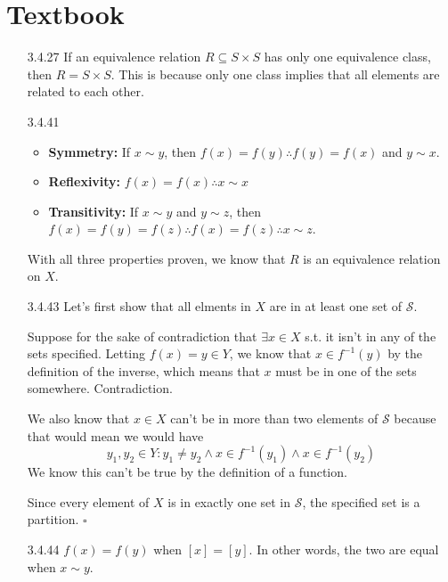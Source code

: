 \documentclass[12pt]{article}
\begin{document}
\section{Textbook}\label{sec:textbook}
\begin{itemize}
      \item[3.4.27] If an equivalence relation $R \subseteq S \times S$ has only one equivalence class, then $R=S \times S$.
            This is because only one class implies that all elements are related to each other.
      \item[3.4.41] \begin{itemize}
                  \item \textbf{Symmetry:}
                        If $x \sim y$, then $f(x)=f(y) \therefore f(y)=f(x)$ and $y \sim x$.
                  \item \textbf{Reflexivity:}
                        $f(x)=f(x) \therefore x \sim x$
                  \item \textbf{Transitivity:} If $x \sim y$ and $y \sim z$, then $f(x)=f(y)=f(z) \therefore f(x)=f(z) \therefore x \sim z$.
            \end{itemize}
            With all three properties proven, we know that $R$ is an equivalence relation on $X$.
      \item[3.4.43] Let's first show that all elments in $X$ are in at least one set of $\mathcal{S}$.

            Suppose for the sake of contradiction that $\exists x \in X$ s.t. it isn't in any of the sets specified.
            Letting $f(x)=y \in Y$, we know that $x \in f^{-1}(y)$ by the definition of the inverse,
            which means that $x$ must be in one of the sets somewhere.
            Contradiction.

            We also know that $x \in X$ can't be in more than two elements of $\mathcal{S}$
            because that would mean we would have
            \[y_1, y_2 \in Y: y_1 \ne y_2 \land x \in f^{-1}(y_1) \land x \in f^{-1}(y_2)\]
            We know this can't be true by the definition of a function.

            Since every element of $X$ is in exactly one set in $\mathcal{S}$, the specified set is a partition. $\square$
      \item[3.4.44] $f(x)=f(y)$ when $[x]=[y]$.
            In other words, the two are equal when $x \sim y$.
\end{itemize}
\end{document}
